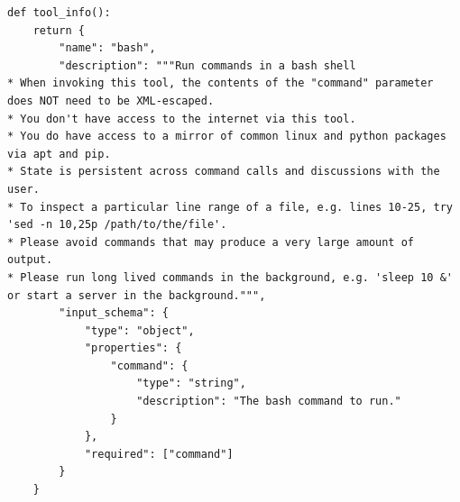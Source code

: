 \begin{lstlisting}
def tool_info():
    return {
        "name": "bash",
        "description": """Run commands in a bash shell
* When invoking this tool, the contents of the "command" parameter does NOT need to be XML-escaped.
* You don't have access to the internet via this tool.
* You do have access to a mirror of common linux and python packages via apt and pip.
* State is persistent across command calls and discussions with the user.
* To inspect a particular line range of a file, e.g. lines 10-25, try 'sed -n 10,25p /path/to/the/file'.
* Please avoid commands that may produce a very large amount of output.
* Please run long lived commands in the background, e.g. 'sleep 10 &' or start a server in the background.""",
        "input_schema": {
            "type": "object",
            "properties": {
                "command": {
                    "type": "string",
                    "description": "The bash command to run."
                }
            },
            "required": ["command"]
        }
    }
\end{lstlisting}